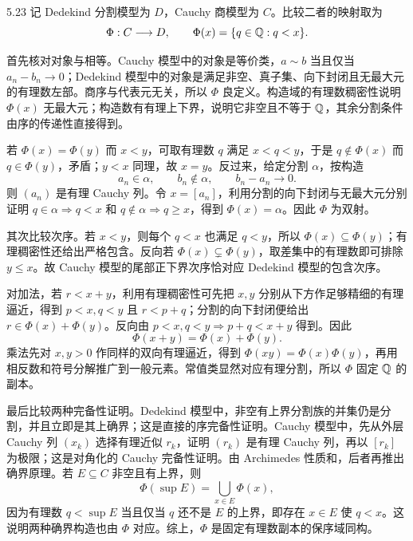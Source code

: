 \begin{solution}{5.23}
记 Dedekind 分割模型为 \(D\)，Cauchy 商模型为 \(C\)。比较二者的映射取为
\[
 \Phi:C\longrightarrow D,\qquad
 \Phi(x)=\{q\in\mathbb{Q}:q<x\}.
\]

首先核对对象与相等。Cauchy 模型中的对象是等价类，\(a\sim b\) 当且仅当
\(a_n-b_n\to0\)；Dedekind 模型中的对象是满足非空、真子集、向下封闭且无最大元的有理数左部。商序与代表元无关，所以 \(\Phi\) 良定义。构造域的有理数稠密性说明 \(\Phi(x)\) 无最大元；构造数有有理上下界，说明它非空且不等于 \(\mathbb{Q}\)，其余分割条件由序的传递性直接得到。

若 \(\Phi(x)=\Phi(y)\) 而 \(x<y\)，可取有理数
\(q\) 满足 \(x<q<y\)，于是 \(q\notin\Phi(x)\) 而
\(q\in\Phi(y)\)，矛盾；\(y<x\) 同理，故 \(x=y\)。反过来，给定分割
\(\alpha\)，按构造
\[
 a_n\in\alpha,\qquad b_n\notin\alpha,\qquad b_n-a_n\to0.
\]
则 \((a_n)\) 是有理 Cauchy 列。令 \(x=[a_n]\)，利用分割的向下封闭与无最大元分别证明
\(q\in\alpha\Rightarrow q<x\) 和
\(q\notin\alpha\Rightarrow q\ge x\)，得到 \(\Phi(x)=\alpha\)。因此
\(\Phi\) 为双射。

其次比较次序。若 \(x<y\)，则每个 \(q<x\) 也满足 \(q<y\)，所以
\(\Phi(x)\subseteq\Phi(y)\)；有理稠密性还给出严格包含。反向若
\(\Phi(x)\subsetneq\Phi(y)\)，取差集中的有理数即可排除 \(y\le x\)。故 Cauchy 模型的尾部正下界次序恰对应 Dedekind 模型的包含次序。

对加法，若 \(r<x+y\)，利用有理稠密性可先把 \(x,y\) 分别从下方作足够精细的有理逼近，得到
\(p<x,q<y\) 且 \(r<p+q\)；分割的向下封闭便给出
\(r\in\Phi(x)+\Phi(y)\)。反向由 \(p<x,q<y\Rightarrow p+q<x+y\) 得到。因此
\[
 \Phi(x+y)=\Phi(x)+\Phi(y).
\]
乘法先对 \(x,y>0\) 作同样的双向有理逼近，得到
\(\Phi(xy)=\Phi(x)\Phi(y)\)，再用相反数和符号分解推广到一般元素。常值类显然对应有理分割，所以 \(\Phi\) 固定 \(\mathbb{Q}\) 的副本。

最后比较两种完备性证明。Dedekind 模型中，非空有上界分割族的并集仍是分割，并且立即是其上确界；这是直接的序完备性证明。Cauchy 模型中，先从外层 Cauchy 列 \((x_k)\) 选择有理近似 \(r_k\)，证明 \((r_k)\) 是有理 Cauchy 列，再以 \([r_k]\) 为极限；这是对角化的 Cauchy 完备性证明。由 Archimedes 性质和，后者再推出确界原理。若 \(E\subseteq C\) 非空且有上界，则
\[
 \Phi(\sup E)=\bigcup_{x\in E}\Phi(x),
\]
因为有理数 \(q<\sup E\) 当且仅当 \(q\) 还不是 \(E\) 的上界，即存在
\(x\in E\) 使 \(q<x\)。这说明两种确界构造也由 \(\Phi\) 对应。综上，\(\Phi\) 是固定有理数副本的保序域同构。
\end{solution}

